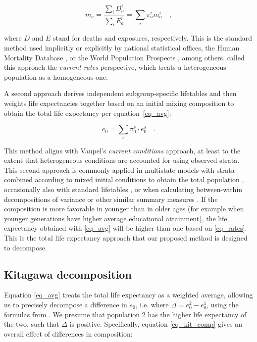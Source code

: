 \documentclass[12pt, sn-apa,pdflatex,letterpaper]{sn-jnl}
\begin{document}
\begin{equation}
\label{eq_rates}
m_a = \frac{\sum_i{D_a^i}}{\sum_i{E_a^i}} = \sum_i \pi_a^i m_a^i \quad \mathrm{,}
\end{equation}

\noindent where $D$ and $E$ stand for deaths and exposures, respectively. This is the standard method used implicitly or explicitly by national statistical offices, the Human Mortality Database \citep{wilmoth2021methods}, or the World Population Prospects \citep{wpp2022mp}, among others. \citet{vaupel2002life} called this approach the \emph{current rates} perspective, which treats a heterogeneous population as a homogeneous one.

A second approach derives independent subgroup-specific lifetables and then weights life expectancies together based on an initial mixing composition to obtain the total life expectancy per equation~\eqref{eq_avg}:

\begin{equation}
\label{eq_avg}
e_0 = \sum_s \pi_0^s \cdot e_0^s \quad \textrm{.}
\end{equation}

\noindent This method aligns with Vaupel's \emph{current conditions} approach, at least to the extent that heterogeneous conditions are accounted for using observed strata. This second approach is commonly applied in multistate models with strata combined according to mixed initial conditions to obtain the total population \citep{caswell2018age, caswell2021healthy}, occasionally also with standard lifetables \citep{gupta1988note, muszynska2022mortality}, or when calculating between-within decompositions of variance or other similar summary measures \citep{seaman2019changing, lifeineq}. If the composition is more favorable in younger than in older ages (for example when younger generations have higher average educational attainment), the life expectancy obtained with \eqref{eq_avg} will be higher than one based on \eqref{eq_rates}. This is the total life expectancy approach that our proposed method is designed to decompose.

\subsection*{Kitagawa decomposition}\label{kitagawa-decomposition}

Equation \eqref{eq_avg} treats the total life expectancy as a weighted average, allowing us to precisely decompose a difference in $e_0$, i.e. where $\Delta = e_0^2 - e_0^1$, using the formulas from \citet{kitagawa1955components}.  We presume that population 2 has the higher life expectancy of the two, such that $\Delta$ is positive. Specifically, equation \eqref{eq_kit_comp} gives an overall effect of differences in composition:
\end{document}
